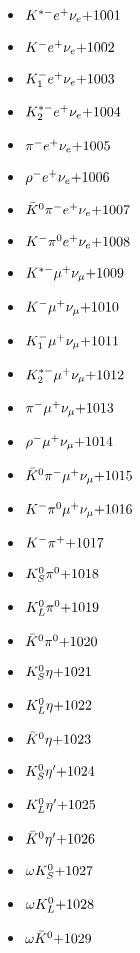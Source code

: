 
 \begin{multicols}{3} 
 \begin{itemize}
 \item $ K^{*-} e^{+} \nu_{e} \hfill{+1001}$
 \item $ K^{-} e^{+} \nu_{e} \hfill{+1002}$
 \item $ K_{1}^{-} e^{+} \nu_{e} \hfill{+1003}$
 \item $ K_{2}^{*-} e^{+} \nu_{e} \hfill{+1004}$
 \item $ \pi^{-} e^{+} \nu_{e} \hfill{+1005}$
 \item $ \rho^{-} e^{+} \nu_{e} \hfill{+1006}$
 \item $ \bar{K}^{0} \pi^{-} e^{+} \nu_{e} \hfill{+1007}$
 \item $ K^{-} \pi^{0} e^{+} \nu_{e} \hfill{+1008}$
 \item $ K^{*-} \mu^{+} \nu_{\mu} \hfill{+1009}$
 \item $ K^{-} \mu^{+} \nu_{\mu} \hfill{+1010}$
 \item $ K_{1}^{-} \mu^{+} \nu_{\mu} \hfill{+1011}$
 \item $ K_{2}^{*-} \mu^{+} \nu_{\mu} \hfill{+1012}$
 \item $ \pi^{-} \mu^{+} \nu_{\mu} \hfill{+1013}$
 \item $ \rho^{-} \mu^{+} \nu_{\mu} \hfill{+1014}$
 \item $ \bar{K}^{0} \pi^{-} \mu^{+} \nu_{\mu} \hfill{+1015}$
 \item $ K^{-} \pi^{0} \mu^{+} \nu_{\mu} \hfill{+1016}$
 \item $ K^{-} \pi^{+} \hfill{+1017}$
 \item $ K_{S}^{0} \pi^{0} \hfill{+1018}$
 \item $ K_{L}^{0} \pi^{0} \hfill{+1019}$
 \item $ \bar{K}^{0} \pi^{0} \hfill{+1020}$
 \item $ K_{S}^{0} \eta \hfill{+1021}$
 \item $ K_{L}^{0} \eta \hfill{+1022}$
 \item $ \bar{K}^{0} \eta \hfill{+1023}$
 \item $ K_{S}^{0} {\eta^{\prime}} \hfill{+1024}$
 \item $ K_{L}^{0} {\eta^{\prime}} \hfill{+1025}$
 \item $ \bar{K}^{0} {\eta^{\prime}} \hfill{+1026}$
 \item $ \omega K_{S}^{0} \hfill{+1027}$
 \item $ \omega K_{L}^{0} \hfill{+1028}$
 \item $ \omega \bar{K}^{0} \hfill{+1029}$

\end{itemize}
\end{multicols}
